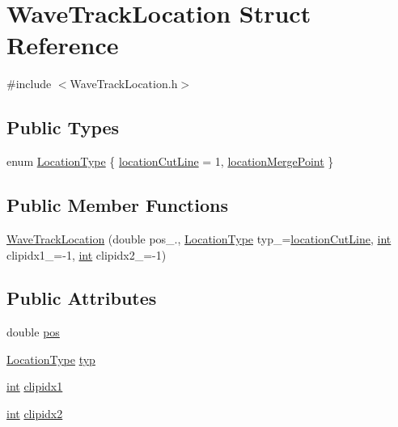 \hypertarget{struct_wave_track_location}{}\section{Wave\+Track\+Location Struct Reference}
\label{struct_wave_track_location}


{\ttfamily \#include $<$Wave\+Track\+Location.\+h$>$}

\subsection*{Public Types}
\begin{DoxyCompactItemize}
\item 
enum \hyperlink{struct_wave_track_location_a0a54a8fbcc73dfe63879bcff10a75c6d}{Location\+Type} \{ \hyperlink{struct_wave_track_location_a0a54a8fbcc73dfe63879bcff10a75c6da399879306fdea1e62201b1045d682e78}{location\+Cut\+Line} = 1, 
\hyperlink{struct_wave_track_location_a0a54a8fbcc73dfe63879bcff10a75c6da871a4f5cfaaaa8055d719336eca06f11}{location\+Merge\+Point}
 \}
\end{DoxyCompactItemize}
\subsection*{Public Member Functions}
\begin{DoxyCompactItemize}
\item 
\hyperlink{struct_wave_track_location_a2d4536fec94edfdd70bda0bdeed9f0b0}{Wave\+Track\+Location} (double pos\+\_., \hyperlink{struct_wave_track_location_a0a54a8fbcc73dfe63879bcff10a75c6d}{Location\+Type} typ\+\_\+=\hyperlink{struct_wave_track_location_a0a54a8fbcc73dfe63879bcff10a75c6da399879306fdea1e62201b1045d682e78}{location\+Cut\+Line}, \hyperlink{xmltok_8h_a5a0d4a5641ce434f1d23533f2b2e6653}{int} clipidx1\+\_\+=-\/1, \hyperlink{xmltok_8h_a5a0d4a5641ce434f1d23533f2b2e6653}{int} clipidx2\+\_\+=-\/1)
\end{DoxyCompactItemize}
\subsection*{Public Attributes}
\begin{DoxyCompactItemize}
\item 
double \hyperlink{struct_wave_track_location_ae4ea9c9afd803ade3db38d9ccb2bb15e}{pos}
\item 
\hyperlink{struct_wave_track_location_a0a54a8fbcc73dfe63879bcff10a75c6d}{Location\+Type} \hyperlink{struct_wave_track_location_a38d3116d13d3787982109693ad523e2a}{typ}
\item 
\hyperlink{xmltok_8h_a5a0d4a5641ce434f1d23533f2b2e6653}{int} \hyperlink{struct_wave_track_location_ab2f2a7b2e9426e2e7bbf8c008f8381f1}{clipidx1}
\item 
\hyperlink{xmltok_8h_a5a0d4a5641ce434f1d23533f2b2e6653}{int} \hyperlink{struct_wave_track_location_a85a589613b40d26ee6d2107ad0f1b242}{clipidx2}
\end{DoxyCompactItemize}


